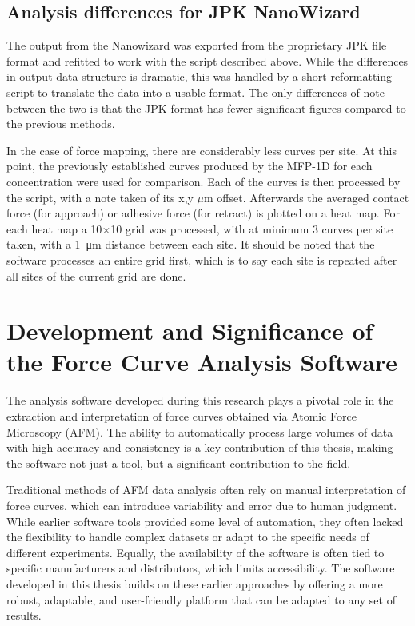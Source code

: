 \subsection{Analysis differences for JPK NanoWizard} %

The output from the Nanowizard was exported from the proprietary JPK file format and refitted to work with the script described above. While the differences in output data structure is dramatic, this was handled by a short reformatting script to translate the data into a usable format. The only differences of note between the two is that the JPK format has fewer significant figures compared to the previous methods.

In the case of force mapping, there are considerably less curves per site. At this point, the previously established curves produced by the MFP-1D for each concentration were used for comparison. Each of the curves is then processed by the script, with a note taken of its x,y $\mu$m offset. Afterwards the averaged contact force (for approach) or adhesive force (for retract) is plotted on a heat map. For each heat map a 10$\times$10 grid was processed, with at minimum 3 curves per site taken, with a \SI{1}{\micro\metre} distance between each site. It should be noted that the software processes an entire grid first, which is to say each site is repeated after all sites of the current grid are done.

\section{Development and Significance of the Force Curve Analysis Software}

The analysis software developed during this research plays a pivotal role in the extraction and interpretation of force curves obtained via Atomic Force Microscopy (AFM). The ability to automatically process large volumes of data with high accuracy and consistency is a key contribution of this thesis, making the software not just a tool, but a significant contribution to the field.

Traditional methods of AFM data analysis often rely on manual interpretation of force curves, which can introduce variability and error due to human judgment. While earlier software tools provided some level of automation, they often lacked the flexibility to handle complex datasets or adapt to the specific needs of different experiments. Equally, the availability of the software is often tied to specific manufacturers and distributors, which limits accessibility. The software developed in this thesis builds on these earlier approaches by offering a more robust, adaptable, and user-friendly platform that can be adapted to any set of results.

